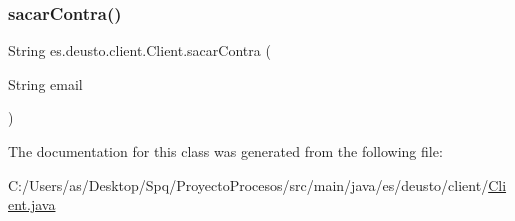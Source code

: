 \mbox{\label{classes_1_1deusto_1_1client_1_1_client_a6ce290f27e4f39f9493799cbc6112cc5}} 
\subsubsection{\texorpdfstring{sacarContra()}{sacarContra()}}
{\footnotesize\ttfamily String es.\+deusto.\+client.\+Client.\+sacar\+Contra (\begin{DoxyParamCaption}\item[{String}]{email }\end{DoxyParamCaption})}



The documentation for this class was generated from the following file\+:\begin{DoxyCompactItemize}
\item 
C\+:/\+Users/as/\+Desktop/\+Spq/\+Proyecto\+Procesos/src/main/java/es/deusto/client/\mbox{\hyperlink{_client_8java}{Client.\+java}}\end{DoxyCompactItemize}
